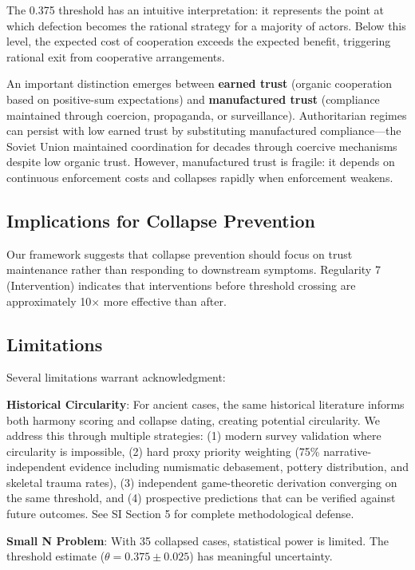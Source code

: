 \documentclass[11pt,a4paper]{article}
\begin{document}
The 0.375 threshold has an intuitive interpretation: it represents the point at which defection becomes the rational strategy for a majority of actors. Below this level, the expected cost of cooperation exceeds the expected benefit, triggering rational exit from cooperative arrangements.

An important distinction emerges between \textbf{earned trust} (organic cooperation based on positive-sum expectations) and \textbf{manufactured trust} (compliance maintained through coercion, propaganda, or surveillance). Authoritarian regimes can persist with low earned trust by substituting manufactured compliance---the Soviet Union maintained coordination for decades through coercive mechanisms despite low organic trust. However, manufactured trust is fragile: it depends on continuous enforcement costs and collapses rapidly when enforcement weakens.

\subsection{Implications for Collapse Prevention}

Our framework suggests that collapse prevention should focus on trust maintenance rather than responding to downstream symptoms. Regularity 7 (Intervention) indicates that interventions before threshold crossing are approximately 10$\times$ more effective than after.

\subsection{Limitations}

Several limitations warrant acknowledgment:

\textbf{Historical Circularity}: For ancient cases, the same historical literature informs both harmony scoring and collapse dating, creating potential circularity. We address this through multiple strategies: (1) modern survey validation where circularity is impossible, (2) hard proxy priority weighting (75\% narrative-independent evidence including numismatic debasement, pottery distribution, and skeletal trauma rates), (3) independent game-theoretic derivation converging on the same threshold, and (4) prospective predictions that can be verified against future outcomes. See SI Section 5 for complete methodological defense.

\textbf{Small N Problem}: With 35 collapsed cases, statistical power is limited. The threshold estimate ($\theta = 0.375 \pm 0.025$) has meaningful uncertainty.
\end{document}
